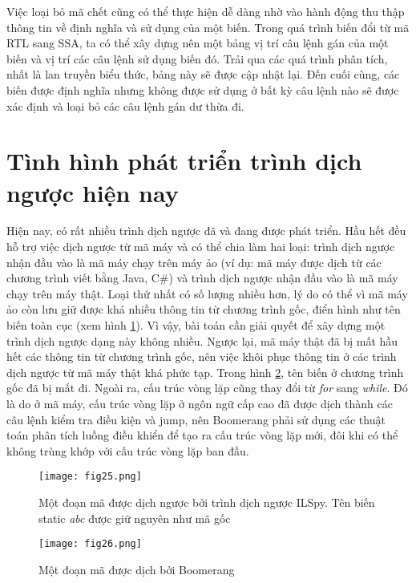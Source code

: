 Việc loại bỏ mã chết cũng có thể thực hiện dễ dàng nhờ vào hành động thu thập thông tin về định nghĩa và sử dụng của một biến. Trong quá trình biến đổi từ mã RTL sang SSA, ta có thể xây dựng nên một bảng vị trí câu lệnh gán của một biến và vị trí các câu lệnh sử dụng biến đó. Trải qua các quá trình phân tích, nhất là lan truyền biểu thức, bảng này sẽ được cập nhật lại. Đến cuối cùng, các biến được định nghĩa nhưng không được sử dụng ở bất kỳ câu lệnh nào sẽ được xác định và loại bỏ các câu lệnh gán dư thừa đi.\\

\section{Tình hình phát triển trình dịch ngược hiện nay}
\label{sec:whyboom}
Hiện nay, có rất nhiều trình dịch ngược đã và đang được phát triển. Hầu hết đều hỗ trợ việc dịch ngược từ mã máy và có thể chia làm hai loại: trình dịch ngược nhận đầu vào là mã máy chạy trên máy ảo (ví dụ: mã máy được dịch từ các chương trình viết bằng Java, C\#) và trình dịch ngược nhận đầu vào là mã máy chạy trên máy thật. Loại thứ nhất có số lượng nhiều hơn, lý do có thể vì mã máy ảo còn lưu giữ được khá nhiều thông tin từ chương trình gốc, điển hình như tên biến toàn cục (xem hình \ref{fig:ilspy}). Vì vậy, bài toán cần giải quyết để xây dựng một trình dịch ngược dạng này không nhiều. Ngược lại, mã máy thật đã bị mất hầu hết các thông tin từ chương trình gốc, nên việc khôi phục thông tin ở các trình dịch ngược từ mã máy thật khá phức tạp. Trong hình \ref{fig:boomerang}, tên biến ở chương trình gốc đã bị mất đi. Ngoài ra, cấu trúc vòng lặp cũng thay đổi từ \textit{for} sang \textit{while}. Đó là do ở mã máy, cấu trúc vòng lặp ở ngôn ngữ cấp cao đã được dịch thành các câu lệnh kiểm tra điều kiện và jump, nên Boomerang phải sử dụng các thuật toán phân tích luồng điều khiển để tạo ra cấu trúc vòng lặp mới, đôi khi có thể không trùng khớp với cấu trúc vòng lặp ban đầu.

\begin{figure}[h]
	\centering
	\texttt{[image: fig25.png]}
	\caption{Một đoạn mã được dịch ngược bởi trình dịch ngược ILSpy. Tên biến static \textit{abc} được giữ nguyên như mã gốc}
	\label{fig:ilspy}
\end{figure}
\begin{figure}[h]
	\centering
	\texttt{[image: fig26.png]}
	\caption{Một đoạn mã được dịch bởi Boomerang}
	\label{fig:boomerang}
\end{figure}

